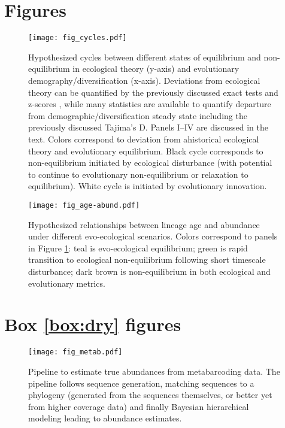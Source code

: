 \documentclass[12pt]{article}
\newcounter{Box}
\begin{document}
\pagebreak

\section*{Figures}

\begin{figure}[!hbp]
  \centering
  \texttt{[image: fig\_cycles.pdf]}
  \caption{Hypothesized cycles between different states of equilibrium
    and non-equilibrium in ecological theory (y-axis) and evolutionary
    demography/diversification (x-axis). Deviations from ecological
    theory can be quantified by the previously discussed exact tests
    \citep{etienne2007} and z-scores \citep{meteR}, while many
    statistics are available to quantify departure from
    demographic/diversification steady state including the previously
    discussed Tajima's D. Panels I--IV are discussed in the text.
    Colors correspond to deviation from ahistorical ecological theory
    and evolutionary equilibrium.  Black cycle corresponds to
    non-equilibrium initiated by ecological disturbance (with
    potential to continue to evolutionary non-equilibrium or
    relaxation to equilibrium). White cycle is initiated by
    evolutionary innovation.}
  \label{fig:cycles}
\end{figure}

\begin{figure}[!hbp]
  \centering
  \texttt{[image: fig\_age-abund.pdf]}
  \caption{Hypothesized relationships between lineage age and
    abundance under different evo-ecological scenarios. Colors
    correspond to panels in Figure \ref{fig:cycles}: teal is
    evo-ecological equilibrium; green is rapid transition to
    ecological non-equilibrium following short timescale disturbance;
    dark brown is non-equilibrium in both ecological and evolutionary
    metrics.}
  \label{fig:age-abund}
\end{figure}

\pagebreak

\section*{Box \ref{box:dry} figures}

\setcounter{figure}{0}
\renewcommand{\thefigure}{\Roman{figure}}

\begin{figure}[!hbp]
  \centering
  \texttt{[image: fig\_metab.pdf]}
  \caption{Pipeline to estimate true abundances from metabarcoding
    data. The pipeline follows sequence generation, matching sequences
    to a phylogeny (generated from the sequences themselves, or better
    yet from higher coverage data) and finally Bayesian hierarchical
    modeling leading to abundance estimates.}
  \label{fig:abundPipeline}
\end{figure}
\end{document}
